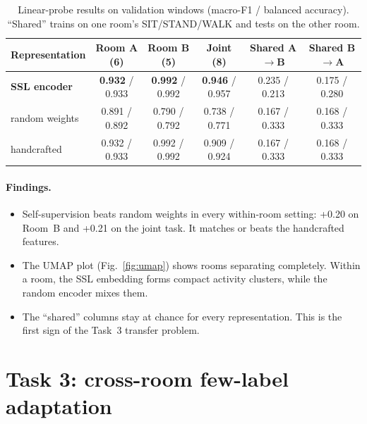 \documentclass[11pt,a4paper]{article}
\begin{document}
\begin{table}[H]
\centering\small
\caption{Linear-probe results on validation windows (macro-F1 / balanced accuracy). ``Shared'' trains on one room's SIT/STAND/WALK and tests on the other room.}
\label{tab:ssl}
\begin{tabular}{lccccc}
\toprule
Representation & Room A (6) & Room B (5) & Joint (8) & Shared A$\to$B & Shared B$\to$A\\
\midrule
\textbf{SSL encoder} & \textbf{0.932} / 0.933 & \textbf{0.992} / 0.992 & \textbf{0.946} / 0.957 & 0.235 / 0.213 & 0.175 / 0.280\\
random weights & 0.891 / 0.892 & 0.790 / 0.792 & 0.738 / 0.771 & 0.167 / 0.333 & 0.168 / 0.333\\
handcrafted & 0.932 / 0.933 & 0.992 / 0.992 & 0.909 / 0.924 & 0.167 / 0.333 & 0.168 / 0.333\\
\bottomrule
\end{tabular}
\end{table}

\paragraph{Findings.}
\begin{itemize}
  \item Self-supervision beats random weights in every within-room setting: +0.20 on Room~B and +0.21 on the joint task. It matches or beats the handcrafted features.
  \item The UMAP plot (Fig.~\ref{fig:umap}) shows rooms separating completely. Within a room, the SSL embedding forms compact activity clusters, while the random encoder mixes them.
  \item The ``shared'' columns stay at chance for every representation. This is the first sign of the Task~3 transfer problem.
\end{itemize}

\section{Task 3: cross-room few-label adaptation}
\end{document}
